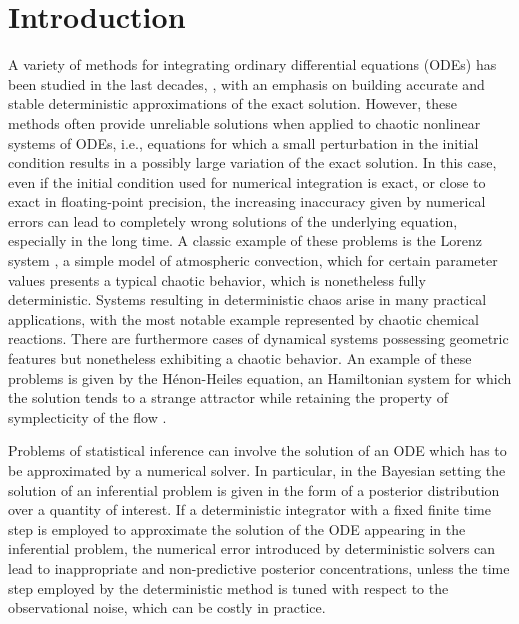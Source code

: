 \documentclass{siamart1116}
\numberwithin{theorem}{section}
\begin{document}
\section{Introduction} 
A variety of methods for integrating ordinary differential equations (ODEs) has been studied in the last decades, \cite{HNW93, HaW96, HLW06}, with an emphasis on building accurate and stable deterministic approximations of the exact solution. However, these methods often provide unreliable solutions when applied to chaotic nonlinear systems of ODEs, i.e., equations for which a small perturbation in the initial condition results in a possibly large variation of the exact solution. In this case, even if the initial condition used for numerical integration is exact, or close to exact in floating-point precision, the increasing inaccuracy given by numerical errors can lead to completely wrong solutions of the underlying equation, especially in the long time. A classic example of these problems is the Lorenz system \cite{Lor63}, a simple model of atmospheric convection, which for certain parameter values presents a typical chaotic behavior, which is nonetheless fully deterministic. Systems resulting in deterministic chaos arise in many practical applications, with the most notable example represented by chaotic chemical reactions. There are furthermore cases of dynamical systems possessing geometric features but nonetheless exhibiting a chaotic behavior. An example of these problems is given by the Hénon-Heiles equation, an Hamiltonian system for which the solution tends to a strange attractor while retaining the property of symplecticity of the flow \cite{HeH64}.

Problems of statistical inference can involve the solution of an ODE which has to be approximated by a numerical solver. In particular, in the Bayesian setting the solution of an inferential problem is given in the form of a posterior distribution over a quantity of interest. If a deterministic integrator with a fixed finite time step is employed to approximate the solution of the ODE appearing in the inferential problem, the numerical error introduced by deterministic solvers can lead to inappropriate and non-predictive posterior concentrations, unless the time step employed by the deterministic method is tuned with respect to the observational noise, which can be costly in practice.
\end{document}
